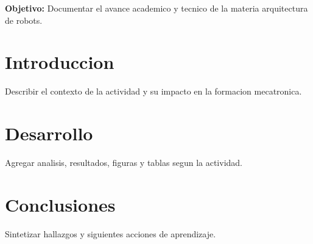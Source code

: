 \documentclass[spanish,letterpaper,oneside]{article}
\begin{document}
\templatePortrait
\templatePagecfg
\onehalfspacing

\begin{abstractd}
\textbf{Objetivo:} Documentar el avance academico y tecnico de la materia arquitectura de robots.
\end{abstractd}

\templateIndex
\templateFinalcfg

\section{Introduccion}
Describir el contexto de la actividad y su impacto en la formacion mecatronica.

\section{Desarrollo}
Agregar analisis, resultados, figuras y tablas segun la actividad.

\section{Conclusiones}
Sintetizar hallazgos y siguientes acciones de aprendizaje.



\end{document}
